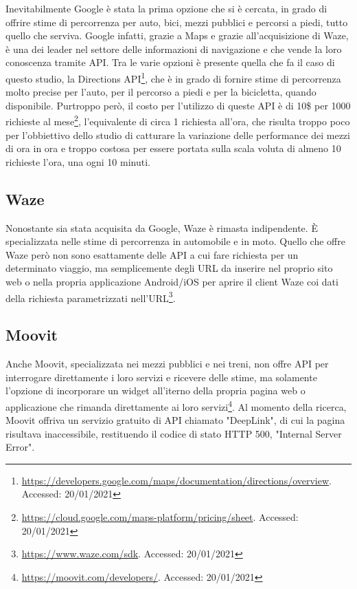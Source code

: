 Inevitabilmente Google è stata la prima opzione che si è cercata, in grado di offrire stime di percorrenza per auto, bici, mezzi pubblici e percorsi a piedi, tutto quello che serviva. Google infatti, grazie a Maps e grazie all'acquisizione di Waze, è una dei leader nel settore delle informazioni di navigazione e che vende la loro conoscenza tramite API. Tra le varie opzioni è presente quella che fa il caso di questo studio, la Directions API\footnote{\url{https://developers.google.com/maps/documentation/directions/overview}. Accessed: 20/01/2021}, che è in grado di fornire stime di percorrenza molto precise per l'auto, per il percorso a piedi e per la bicicletta, quando disponibile. Purtroppo però, il costo per l'utilizzo di queste API è di 10\$ per 1000 richieste al mese\footnote{\url{https://cloud.google.com/maps-platform/pricing/sheet}. Accessed: 20/01/2021}, l'equivalente di circa 1 richiesta all'ora, che risulta troppo poco per l'obbiettivo dello studio di catturare la variazione delle performance dei mezzi di ora in ora e troppo costosa per essere portata sulla scala voluta di almeno 10 richieste l'ora, una ogni 10 minuti.

\subsection{Waze}

Nonostante sia stata acquisita da Google, Waze è rimasta indipendente. È specializzata nelle stime di percorrenza in automobile e in moto. Quello che offre Waze però non sono esattamente delle API a cui fare richiesta per un determinato viaggio, ma semplicemente degli URL da inserire nel proprio sito web o nella propria applicazione Android/iOS per aprire il client Waze coi dati della richiesta parametrizzati nell'URL\footnote{\url{https://www.waze.com/sdk}. Accessed: 20/01/2021}.

\subsection{Moovit}

Anche Moovit, specializzata nei mezzi pubblici e nei treni, non offre API per interrogare direttamente i loro servizi e ricevere delle stime, ma solamente l'opzione di incorporare un widget all'iterno della propria pagina web o applicazione che rimanda direttamente ai loro servizi\footnote{\url{https://moovit.com/developers/}. Accessed: 20/01/2021}. Al momento della ricerca, Moovit offriva un servizio gratuito di API chiamato "DeepLink", di cui la pagina risultava inaccessibile, restituendo il codice di stato HTTP 500, "Internal Server Error".

